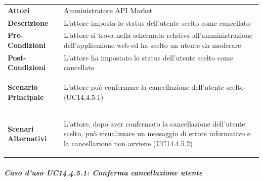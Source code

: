 \begin{minipage}{\linewidth}
	\begin{tabular}{ l | p{11cm}}
		\hline
		\rowcolor{Gray}
		\multicolumn{2}{c}{UC14.4.5 - Cancellazione utente} \\
		\hline
		\textbf{Attori} & Amministratore API Market \\
		\textbf{Descrizione} & L'attore imposta lo status dell'utente scelto come cancellato \\
		\textbf{Pre-Condizioni} & L'attore si trova nella schermata relativa all'amministrazione dell'applicazione web ed ha scelto un utente da moderare \\
		\textbf{Post-Condizioni} & L'attore ha impostato lo status dell'utente scelto come cancellato \\
		\textbf{Scenario Principale} & 
		\begin{enumerate*}[label=(\arabic*.),itemjoin={\newline}]
			\item L'attore può confermare la cancellazione dell'utente scelto (UC14.4.5.1)
		\end{enumerate*}\\
		\textbf{Scenari Alternativi} & 
		\begin{enumerate*}[label=(\arabic*.),itemjoin={\newline}]
			\item L'attore, dopo aver confermato la cancellazione dell'utente scelto, può visualizzare un messaggio di errore informativo e la cancellazione non avviene (UC14.4.5.2)
		\end{enumerate*}\\
	\end{tabular}
\end{minipage}

\subparagraph{Caso d'uso UC14.4.5.1: Conferma cancellazione utente}
\label{UC14_4_5_1}

